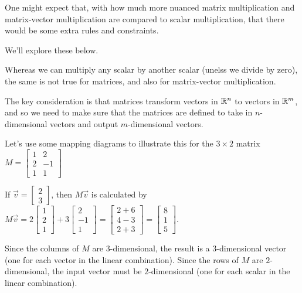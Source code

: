 \documentclass{ximera}
\begin{document}
\begin{exploration}

    One might expect that, with how much more nuanced matrix multiplication and matrix-vector multiplication are compared to scalar multiplication, that there would be some extra rules and constraints.

    We'll explore these below.

    \begin{example}

        Whereas we can multiply any scalar by another scalar (unelss we divide by zero), the same is not true for matrices, and also for matrix-vector multiplication.

        The key consideration is that matrices transform vectors in $\mathbb{R}^n$ to vectors in $\mathbb{R}^m$, and so we need to make sure that the matrices are defined to take in $n$-dimensional vectors and output $m$-dimensional vectors.

        Let's use some mapping diagrams to illustrate this for the $3\times 2$ matrix \(M=\begin{bmatrix} 1 & 2 \\ 2&-1 \\ 1 & 1\end{bmatrix}\)

        If $\vec{v}= \begin{bmatrix} 2 \\ 3 \end{bmatrix}$, then $M\vec{v}$ is calculated by $M\vec{v}=2 \begin{bmatrix} 1 \\ 2 \\ 1 \end{bmatrix}+3 \begin{bmatrix} 2 \\ -1 \\ 1 \end{bmatrix}=\begin{bmatrix} 2+6 \\ 4-3 \\ 2+3 \end{bmatrix}=\begin{bmatrix} 8 \\ 1 \\ 5 \end{bmatrix}$.

        Since the columns of $M$ are $3$-dimensional, the result is a $3$-dimensional vector (one for each vector in the linear combination). Since the rows of $M$ are $2$-dimensional, the input vector must be $2$-dimensional (one for each scalar in the linear combination).


\end{example}
\end{exploration}
\end{document}
